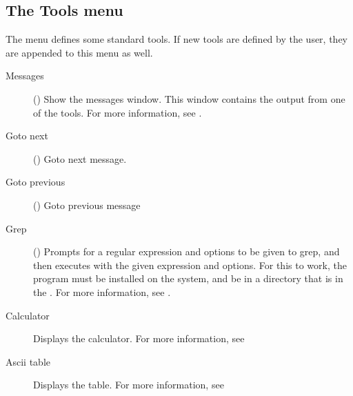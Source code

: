 \subsection{The Tools menu}
\label{se:menutools}
The  menu defines some standard tools. If new tools are defined by the
user, they are appended to this menu as well.
\begin{description}
\item[Messages] () Show the messages window. 
This window contains the output from one of the tools. For more information,
see .
\item[Goto next] () Goto next message.
\item[Goto previous] () Goto previous message
\item[Grep] () Prompts for a regular expression and options
to be given to grep, and then executes  with the given expression and
options. For this to work, the  program must be installed on the
system, and be in a directory that is in the . For more
information, see .
\item[Calculator] 
Displays the calculator. For more information, see 
\item[Ascii table] Displays the  table. For more information, see
\end{description}
%
%
